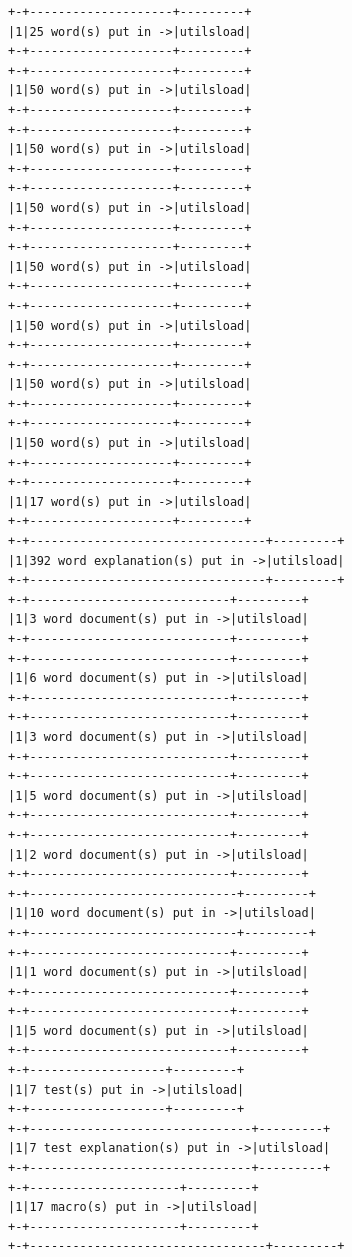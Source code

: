 \documentclass[11pt,letter,landscape]{article}
\begin{document}
    \begin{Verbatim}[commandchars=\\\{\}]
+-+--------------------+---------+
|1|25 word(s) put in ->|utilsload|
+-+--------------------+---------+
+-+--------------------+---------+
|1|50 word(s) put in ->|utilsload|
+-+--------------------+---------+
+-+--------------------+---------+
|1|50 word(s) put in ->|utilsload|
+-+--------------------+---------+
+-+--------------------+---------+
|1|50 word(s) put in ->|utilsload|
+-+--------------------+---------+
+-+--------------------+---------+
|1|50 word(s) put in ->|utilsload|
+-+--------------------+---------+
+-+--------------------+---------+
|1|50 word(s) put in ->|utilsload|
+-+--------------------+---------+
+-+--------------------+---------+
|1|50 word(s) put in ->|utilsload|
+-+--------------------+---------+
+-+--------------------+---------+
|1|50 word(s) put in ->|utilsload|
+-+--------------------+---------+
+-+--------------------+---------+
|1|17 word(s) put in ->|utilsload|
+-+--------------------+---------+
+-+---------------------------------+---------+
|1|392 word explanation(s) put in ->|utilsload|
+-+---------------------------------+---------+
+-+----------------------------+---------+
|1|3 word document(s) put in ->|utilsload|
+-+----------------------------+---------+
+-+----------------------------+---------+
|1|6 word document(s) put in ->|utilsload|
+-+----------------------------+---------+
+-+----------------------------+---------+
|1|3 word document(s) put in ->|utilsload|
+-+----------------------------+---------+
+-+----------------------------+---------+
|1|5 word document(s) put in ->|utilsload|
+-+----------------------------+---------+
+-+----------------------------+---------+
|1|2 word document(s) put in ->|utilsload|
+-+----------------------------+---------+
+-+-----------------------------+---------+
|1|10 word document(s) put in ->|utilsload|
+-+-----------------------------+---------+
+-+----------------------------+---------+
|1|1 word document(s) put in ->|utilsload|
+-+----------------------------+---------+
+-+----------------------------+---------+
|1|5 word document(s) put in ->|utilsload|
+-+----------------------------+---------+
+-+-------------------+---------+
|1|7 test(s) put in ->|utilsload|
+-+-------------------+---------+
+-+-------------------------------+---------+
|1|7 test explanation(s) put in ->|utilsload|
+-+-------------------------------+---------+
+-+---------------------+---------+
|1|17 macro(s) put in ->|utilsload|
+-+---------------------+---------+
+-+---------------------------------+---------+

\end{Verbatim}
\end{document}
